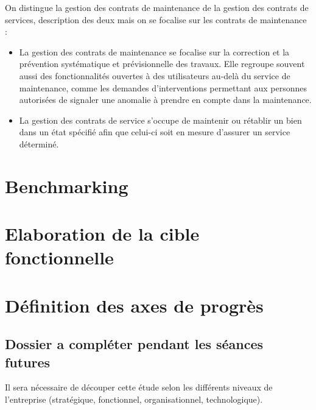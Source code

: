On distingue la gestion des contrats de maintenance de la gestion des contrats de services, description des deux mais on se focalise sur les contrats de maintenance :

\begin{itemize}
\item La gestion des contrats de maintenance se focalise sur la correction et la prévention systématique et prévisionnelle des travaux. Elle regroupe souvent aussi des fonctionnalités ouvertes à des utilisateurs au-delà du service de maintenance, comme les demandes d’interventions permettant aux personnes autorisées de signaler une anomalie à prendre en compte dans la maintenance.
\item La gestion des contrats de service s’occupe de maintenir ou rétablir un bien dans un état spécifié afin que celui-ci soit en mesure d’assurer un service déterminé.
\end{itemize}




\section{Benchmarking}


\section{Elaboration de la cible fonctionnelle}


\section{Définition des axes de progrès}





\subsection{Dossier a compléter pendant les séances futures}

Il sera nécessaire de découper cette étude selon les différents niveaux de l’entreprise (stratégique, fonctionnel, organisationnel, technologique).

